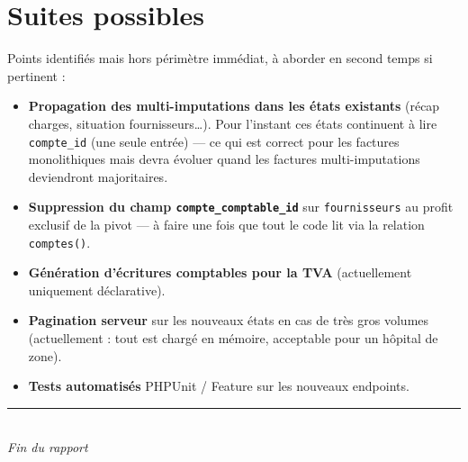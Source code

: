 \documentclass[11pt,a4paper]{article}
\begin{document}
\newpage

\section{Suites possibles}

Points identifiés mais hors périmètre immédiat, à aborder en second
temps si pertinent :

\begin{itemize}[leftmargin=1.4em]
  \item \textbf{Propagation des multi-imputations dans les états existants}
    (récap charges, situation fournisseurs\dots{}). Pour l'instant ces états
    continuent à lire \texttt{compte\_id} (une seule entrée) --- ce qui est
    correct pour les factures monolithiques mais devra évoluer quand les
    factures multi-imputations deviendront majoritaires.
  \item \textbf{Suppression du champ \texttt{compte\_comptable\_id}} sur
    \texttt{fournisseurs} au profit exclusif de la pivot --- à faire une fois
    que tout le code lit via la relation \texttt{comptes()}.
  \item \textbf{Génération d'écritures comptables pour la TVA} (actuellement
    uniquement déclarative).
  \item \textbf{Pagination serveur} sur les nouveaux états en cas de très
    gros volumes (actuellement : tout est chargé en mémoire, acceptable
    pour un hôpital de zone).
  \item \textbf{Tests automatisés} PHPUnit / Feature sur les nouveaux
    endpoints.
\end{itemize}

\vspace{1cm}

\begin{center}
  \textcolor{primary}{\rule{0.4\textwidth}{0.5pt}}\\[0.5em]
  \emph{Fin du rapport}
\end{center}
\end{document}
